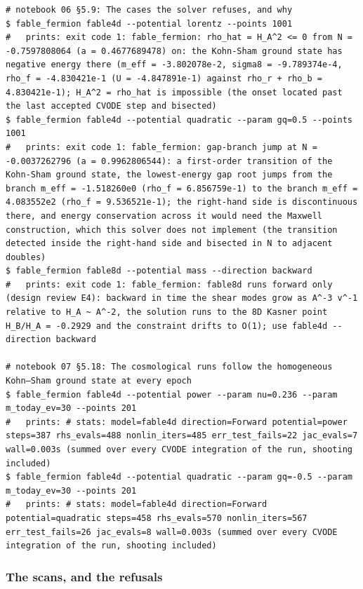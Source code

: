 \begin{Verbatim}
# notebook 06 §5.9: The cases the solver refuses, and why
$ fable_fermion fable4d --potential lorentz --points 1001
#   prints: exit code 1: fable_fermion: rho_hat = H_A^2 <= 0 from N = -0.7597808064 (a = 0.4677689478) on: the Kohn-Sham ground state has negative energy there (m_eff = -3.802078e-2, sigma8 = -9.789374e-4, rho_f = -4.830421e-1 (U = -4.847891e-1) against rho_r + rho_b = 4.830421e-1); H_A^2 = rho_hat is impossible (the onset located past the last accepted CVODE step and bisected)
$ fable_fermion fable4d --potential quadratic --param gq=0.5 --points 1001
#   prints: exit code 1: fable_fermion: gap-branch jump at N = -0.0037262796 (a = 0.9962806544): a first-order transition of the Kohn-Sham ground state, the lowest-energy gap root jumps from the branch m_eff = -1.518260e0 (rho_f = 6.856759e-1) to the branch m_eff = 4.083552e2 (rho_f = 9.536521e-1); the right-hand side is discontinuous there, and energy conservation across it would need the Maxwell construction, which this solver does not implement (the transition detected inside the right-hand side and bisected in N to adjacent doubles)
$ fable_fermion fable8d --potential mass --direction backward
#   prints: exit code 1: fable_fermion: fable8d runs forward only (design review E4): backward in time the shear modes grow as A^-3 v^-1 relative to H_A ~ A^-2, the solution runs to the 8D Kasner point H_B/H_A = -0.2929 and the constraint drifts to O(1); use fable4d --direction backward

# notebook 07 §5.18: The cosmological runs follow the homogeneous Kohn–Sham ground state at every epoch
$ fable_fermion fable4d --potential power --param nu=0.236 --param m_today_ev=30 --points 201
#   prints: # stats: model=fable4d direction=Forward potential=power steps=387 rhs_evals=488 nonlin_iters=485 err_test_fails=22 jac_evals=7 wall=0.003s (summed over every CVODE integration of the run, shooting included)
$ fable_fermion fable4d --potential quadratic --param gq=-0.5 --param m_today_ev=30 --points 201
#   prints: # stats: model=fable4d direction=Forward potential=quadratic steps=458 rhs_evals=570 nonlin_iters=567 err_test_fails=26 jac_evals=8 wall=0.003s (summed over every CVODE integration of the run, shooting included)
\end{Verbatim}

\subsubsection{The scans, and the refusals}
\label{sec:6.4.8}

